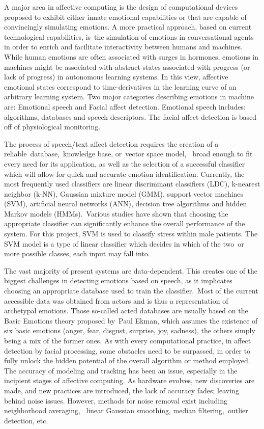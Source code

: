 A major area in affective computing is the design of computational devices proposed to exhibit either innate emotional capabilities 
or that are capable of convincingly simulating emotions. A more practical approach, based on current technological capabilities, 
is the simulation of emotions in conversational agents in order to enrich and facilitate interactivity between humans and machines. \cite{social-media} 
While human emotions are often associated with surges in hormones, emotions in machines might be associated with abstract states 
associated with progress (or lack of progress) in autonomous learning systems. In this view, affective emotional states correspond to 
time-derivatives in the learning curve of an arbitrary learning system. Two major categories describing emotions in machine are: 
Emotional speech and Facial affect detection. Emotional speech includes: algorithms, databases and speech descriptors. 
The facial affect detection is based off of physiological monitoring. \cite{emotional}

The process of speech/text affect detection requires the creation of a reliable database, knowledge base, or vector space model, 
broad enough to fit every need for its application, as well as the selection of a successful classifier which will allow for quick and 
accurate emotion identification. Currently, the most frequently used classifiers are linear discriminant classifiers (LDC), 
k-nearest neighbor (k-NN), Gaussian mixture model (GMM), support vector machines (SVM), artificial neural networks (ANN), decision 
tree algorithms and hidden Markov models (HMMs). Various studies have shown that choosing the appropriate classifier can significantly 
enhance the overall performance of the system. \cite{ecommerce} For this project, SVM is used to classify stress within male patients. The SVM model is 
a type of linear classifier which decides in which of the two or more possible classes, each input may fall into. \cite{deep-learning}

The vast majority of present systems are data-dependent. This creates one of the biggest challenges in detecting emotions based on speech, 
as it implicates choosing an appropriate database used to train the classifier. Most of the current accessible data was obtained from actors 
and is thus a representation of archetypal emotions. Those so-called acted databases are usually based on the Basic Emotions theory proposed 
by Paul Ekman, which assumes the existence of six basic emotions (anger, fear, disgust, surprise, joy, sadness), the others simply being a mix 
of the former ones. \cite{augmented-reality} As with every computational practice, in affect detection by facial processing, some obstacles need to be surpassed, 
in order to fully unlock the hidden potential of the overall algorithm or method employed. The accuracy of modeling and tracking has been 
an issue, especially in the incipient stages of affective computing. As hardware evolves, new discoveries are made, and new practices are 
introduced, the lack of accuracy fades; leaving behind noise issues. However, methods for noise removal exist including neighborhood averaging, 
linear Gaussian smoothing, median filtering, outlier detection, etc. \cite{student}

